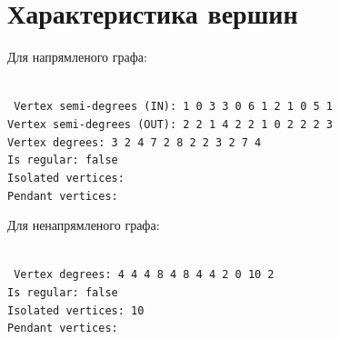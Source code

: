 \section{Характеристика вершин}
\begin{framed}
  \noindent%
  Для напрямленого графа:\\\\
  \raggedright\footnotesize\texttt{%
    Vertex semi-degrees (IN):  1 0 3 3 0 6 1 2 1 0 5 1\\
    Vertex semi-degrees (OUT): 2 2 1 4 2 2 1 0 2 2 2 3\\
    Vertex degrees:            3 2 4 7 2 8 2 2 3 2 7 4\\
    Is regular: false\\
    Isolated vertices:\\
    Pendant vertices:\\
  }
\end{framed}
\begin{framed}
  \noindent%
  Для ненапрямленого графа:\\\\
  \raggedright\footnotesize\texttt{%
    Vertex degrees:            4 4 4 8 4 8 4 4 2 0 10 2\\
    Is regular: false\\
    Isolated vertices:         10\\
    Pendant vertices:\\
  }
\end{framed}
\hfill

